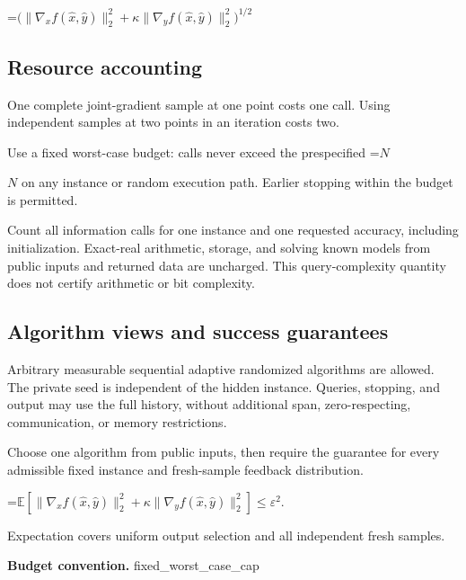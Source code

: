 \documentclass[10pt,a4paper]{article}
\newcommand{\AtlasMath}[1]{\par\begingroup\centering\setbox0=\hbox{$\displaystyle #1$}\ifdim\wd0>1.4\linewidth\typeout{ATLAS WIDE FORMULA: \the\wd0}\fi\ifdim\wd0>\linewidth\resizebox{\linewidth}{!}{\box0}\else\box0\fi\par\endgroup}
\newcommand{\AtlasInlineMath}[1]{\begingroup\setbox0=\hbox{$#1$}\ifdim\wd0>.4\linewidth\endgroup\AtlasMath{#1}\else\endgroup$#1$\fi}
\begin{document}
\AtlasMath{\bigl(\|\nabla_x f(\widehat{x},\widehat{y})\|_2^2+\kappa\|\nabla_y f(\widehat{x},\widehat{y})\|_2^2\bigr)^{1/2}}




\subsection{Resource accounting}


One complete joint-gradient sample at one point costs one call. Using independent samples at two points in an iteration costs two.



Use a fixed worst-case budget: calls never exceed the prespecified \AtlasInlineMath{N} on any instance or random execution path. Earlier stopping within the budget is permitted.



Count all information calls for one instance and one requested accuracy, including initialization. Exact-real arithmetic, storage, and solving known models from public inputs and returned data are uncharged. This query-complexity quantity does not certify arithmetic or bit complexity.



\subsection{Algorithm views and success guarantees}


Arbitrary measurable sequential adaptive randomized algorithms are allowed. The private seed is independent of the hidden instance. Queries, stopping, and output may use the full history, without additional span, zero-respecting, communication, or memory restrictions.



Choose one algorithm from public inputs, then require the guarantee for every admissible fixed instance and fresh-sample feedback distribution.




\AtlasMath{\mathbb E\!\left[\|\nabla_x f(\widehat x,\widehat y)\|_2^2+\kappa\|\nabla_y f(\widehat x,\widehat y)\|_2^2\right]\le\varepsilon^2.}




Expectation covers uniform output selection and all independent fresh samples.



\textbf{Budget convention.} fixed\_worst\_case\_cap
\end{document}
